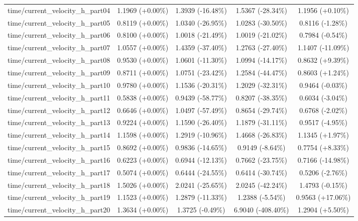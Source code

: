 \begin{table}[htbp]
{\begin{tabular}{lcccc}
time/current\_velocity\_h\_part04 & 1.1969 (+0.00\%) & 1.3939 (-16.48\%) & 1.5367 (-28.34\%) & 1.1956 (+0.10\%) \\
time/current\_velocity\_h\_part05 & 0.8119 (+0.00\%) & 1.0340 (-26.95\%) & 1.0283 (-30.50\%) & 0.8116 (-1.28\%) \\
time/current\_velocity\_h\_part06 & 0.8100 (+0.00\%) & 1.0018 (-21.49\%) & 1.0019 (-21.02\%) & 0.7984 (-0.54\%) \\
time/current\_velocity\_h\_part07 & 1.0557 (+0.00\%) & 1.4359 (-37.40\%) & 1.2763 (-27.40\%) & 1.1407 (-11.09\%) \\
time/current\_velocity\_h\_part08 & 0.9530 (+0.00\%) & 1.0601 (-11.30\%) & 1.0994 (-14.17\%) & 0.8632 (+9.39\%) \\
time/current\_velocity\_h\_part09 & 0.8711 (+0.00\%) & 1.0751 (-23.42\%) & 1.2584 (-44.47\%) & 0.8603 (+1.24\%) \\
time/current\_velocity\_h\_part10 & 0.9780 (+0.00\%) & 1.1536 (-20.31\%) & 1.2029 (-32.31\%) & 0.9464 (-0.03\%) \\
time/current\_velocity\_h\_part11 & 0.5838 (+0.00\%) & 0.9439 (-58.77\%) & 0.8207 (-38.35\%) & 0.6034 (-3.04\%) \\
time/current\_velocity\_h\_part12 & 0.6646 (+0.00\%) & 1.0497 (-57.49\%) & 0.8654 (-29.74\%) & 0.6768 (-2.02\%) \\
time/current\_velocity\_h\_part13 & 0.9224 (+0.00\%) & 1.1590 (-26.40\%) & 1.1879 (-31.11\%) & 0.9517 (-4.95\%) \\
time/current\_velocity\_h\_part14 & 1.1598 (+0.00\%) & 1.2919 (-10.96\%) & 1.4668 (-26.83\%) & 1.1345 (+1.97\%) \\
time/current\_velocity\_h\_part15 & 0.8692 (+0.00\%) & 0.9836 (-14.65\%) & 0.9149 (-8.64\%) & 0.7754 (+8.33\%) \\
time/current\_velocity\_h\_part16 & 0.6223 (+0.00\%) & 0.6944 (-12.13\%) & 0.7662 (-23.75\%) & 0.7166 (-14.98\%) \\
time/current\_velocity\_h\_part17 & 0.5074 (+0.00\%) & 0.6444 (-24.55\%) & 0.6414 (-30.74\%) & 0.5206 (-2.76\%) \\
time/current\_velocity\_h\_part18 & 1.5026 (+0.00\%) & 2.0241 (-25.65\%) & 2.0245 (-42.24\%) & 1.4793 (-0.15\%) \\
time/current\_velocity\_h\_part19 & 1.1523 (+0.00\%) & 1.2879 (-11.33\%) & 1.2388 (-5.54\%) & 0.9563 (+17.06\%) \\
time/current\_velocity\_h\_part20 & 1.3634 (+0.00\%) & 1.3725 (-0.49\%) & 6.9040 (-408.40\%) & 1.2904 (+5.50\%) \\

\end{tabular}}
\end{table}
